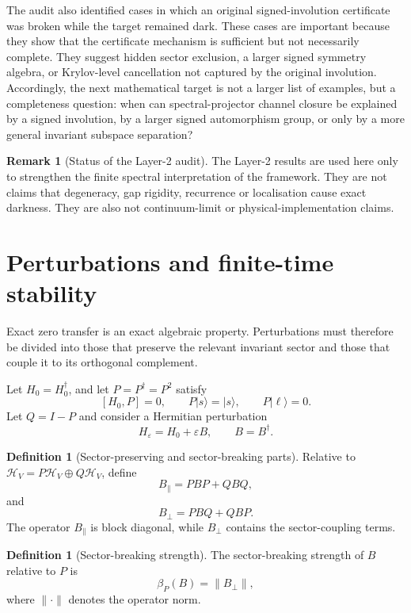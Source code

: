 \documentclass[11pt]{article}
\theoremstyle{definition}
\newtheorem{definition}[theorem]{Definition}
\newtheorem{remark}[theorem]{Remark}
\newcommand{\cH}{\mathcal H}
\begin{document}
The audit also identified cases in which an original signed-involution certificate was broken while the target remained dark.  These cases are important because they show that the certificate mechanism is sufficient but not necessarily complete.  They suggest hidden sector exclusion, a larger signed symmetry algebra, or Krylov-level cancellation not captured by the original involution.  Accordingly, the next mathematical target is not a larger list of examples, but a completeness question: when can spectral-projector channel closure be explained by a signed involution, by a larger signed automorphism group, or only by a more general invariant subspace separation?

\begin{remark}[Status of the Layer-2 audit]
The Layer-2 results are used here only to strengthen the finite spectral interpretation of the framework.  They are not claims that degeneracy, gap rigidity, recurrence or localisation cause exact darkness.  They are also not continuum-limit or physical-implementation claims.
\end{remark}

\section{Perturbations and finite-time stability}
Exact zero transfer is an exact algebraic property. Perturbations must therefore be divided into those that preserve the relevant invariant sector and those that couple it to its orthogonal complement.

Let $H_0=H_0^\dagger$, and let $P=P^\dagger=P^2$ satisfy
\[
[H_0,P]=0,
\qquad P|s\rangle=|s\rangle,
\qquad P|\ell\rangle=0.
\]
Let $Q=I-P$ and consider a Hermitian perturbation
\[
H_\varepsilon=H_0+\varepsilon B,
\qquad B=B^\dagger.
\]

\begin{definition}[Sector-preserving and sector-breaking parts]
Relative to $\cH_V=P\cH_V\oplus Q\cH_V$, define
\[
B_\parallel=PBP+QBQ,
\]
and
\[
B_\perp=PBQ+QBP.
\]
The operator $B_\parallel$ is block diagonal, while $B_\perp$ contains the sector-coupling terms.
\end{definition}

\begin{definition}[Sector-breaking strength]
The sector-breaking strength of $B$ relative to $P$ is
\[
\beta_P(B)=\|B_\perp\|,
\]
where $\|\cdot\|$ denotes the operator norm.
\end{definition}
\end{document}
